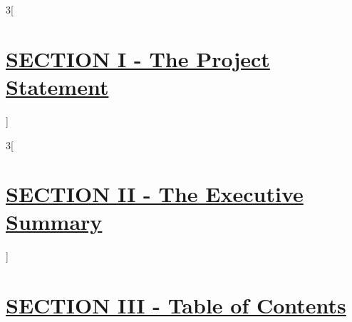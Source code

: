 \documentclass[11pt,a4paper,numbers=noenddot]{scrartcl}
\begin{document}


\begin{paracol}{3}[\section{\underline{SECTION I - The Project Statement}}]

\end{paracol}

\begin{paracol}{3}[\section{\underline{SECTION II - The Executive Summary}}]

\end{paracol}

\newpage
\section{\underline{SECTION III - Table of Contents}}
\tableofcontents
	
\end{document}
